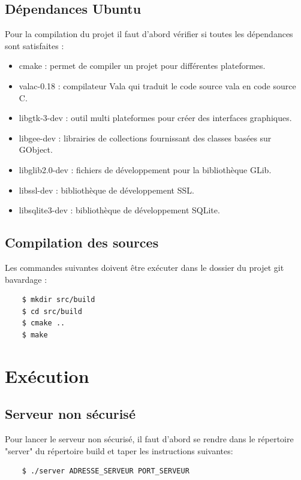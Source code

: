 \documentclass[a4paper,11pt,french]{book}
\begin{document}
\subsection{Dépendances Ubuntu}
Pour la compilation du projet il faut d'abord vérifier si toutes les dépendances sont satisfaites :
\begin{itemize}
\item cmake : permet de compiler un projet pour différentes plateformes.
\item valac-0.18 : compilateur Vala qui traduit le code source vala en code source C.
\item libgtk-3-dev : outil multi plateformes pour créer des interfaces graphiques.
\item libgee-dev : librairies de collections fournissant des classes basées sur GObject.
\item libglib2.0-dev : fichiers de développement pour la bibliothèque GLib.
\item libssl-dev : bibliothèque de développement SSL.
\item libsqlite3-dev : bibliothèque de développement SQLite.

\end{itemize}

\subsection{Compilation des sources}

Les commandes suivantes doivent être exécuter dans le dossier du projet git bavardage : 
\begin{verbatim}
    $ mkdir src/build 
    $ cd src/build 
    $ cmake .. 
    $ make
\end{verbatim}

\section{Exécution}

\subsection{Serveur non sécurisé}
Pour lancer le serveur non sécurisé, il faut d'abord se rendre dans le répertoire "server" du répertoire build et taper les instructions suivantes:

\begin{verbatim}
    $ ./server ADRESSE_SERVEUR PORT_SERVEUR
\end{verbatim}
\end{document}
